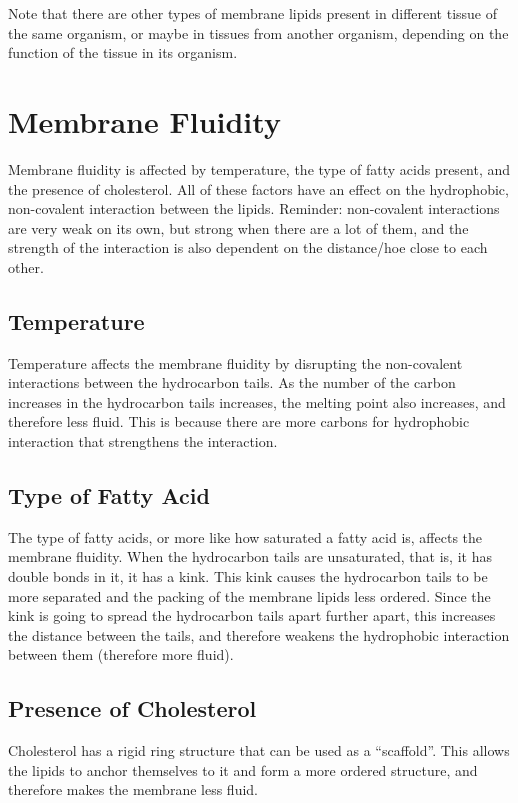 Note that there are other types of membrane lipids present in different tissue of the same organism, or maybe in tissues from another organism, depending on the function of the tissue in its organism.

\section{Membrane Fluidity}

Membrane fluidity is affected by temperature, the type of fatty acids present, and the presence of cholesterol.
All of these factors have an effect on the hydrophobic, non-covalent interaction between the lipids.
Reminder: non-covalent interactions are very weak on its own, but strong when there are a lot of them, and the strength of the interaction is also dependent on the distance/hoe close to each other.

\subsection{Temperature}

Temperature affects the membrane fluidity by disrupting the non-covalent interactions between the hydrocarbon tails.
As the number of the carbon increases in the hydrocarbon tails increases, the melting point also increases, and therefore less fluid.
This is because there are more carbons for hydrophobic interaction that strengthens the interaction.

\subsection{Type of Fatty Acid}

The type of fatty acids, or more like how saturated a fatty acid is, affects the membrane fluidity.
When the hydrocarbon tails are unsaturated, that is, it has double bonds in it, it has a kink.
This kink causes the hydrocarbon tails to be more separated and the packing of the membrane lipids less ordered.
Since the kink is going to spread the hydrocarbon tails apart further apart, this increases the distance between the tails, and therefore weakens the hydrophobic interaction between them (therefore more fluid).

\subsection{Presence of Cholesterol}

Cholesterol has a rigid ring structure that can be used as a ``scaffold''.
This allows the lipids to anchor themselves to it and form a more ordered structure, and therefore makes the membrane less fluid.


